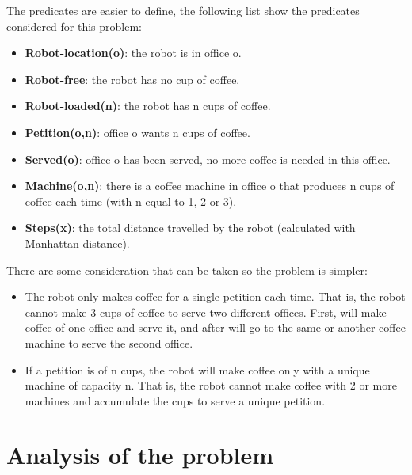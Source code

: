\documentclass[12pt,a4paper,oneside]{article}
\numberwithin{equation}{section}
\numberwithin{equation}{section}
\theoremstyle{definition}
\begin{document}
The predicates are easier to define, the following list show the predicates considered for this problem:

\begin{itemize}
	\item \textbf{Robot-location(o)}: the robot is in office o.
	
	\item \textbf{Robot-free}: the robot has no cup of coffee.
	
	\item \textbf{Robot-loaded(n)}: the robot has n cups of coffee.
	
	\item \textbf{Petition(o,n)}: office o wants n cups of coffee.
	
	\item \textbf{Served(o)}: office o has been served, no more coffee is needed in this office.
		
	\item \textbf{Machine(o,n)}: there is a coffee machine in office o that produces n cups of coffee each time (with n equal to 1, 2 or 3).
	
	\item \textbf{Steps(x)}: the total distance travelled by the robot (calculated with Manhattan distance).
		
\end{itemize}

There are some consideration that can be taken so the problem is simpler:

\begin{itemize}
	\item The robot only makes coffee for a single petition each time. That is, the robot cannot make 3 cups of coffee to serve two different offices. First, will make coffee of one office and serve it, and after will go to the same or another coffee machine to serve the second office.
	
	\item If a petition is of n cups, the robot will make coffee only with a unique machine of capacity n. That is, the robot cannot make coffee with 2 or more machines and accumulate the cups to serve a unique petition.
	
\end{itemize}


\section{Analysis of the problem}
\end{document}
